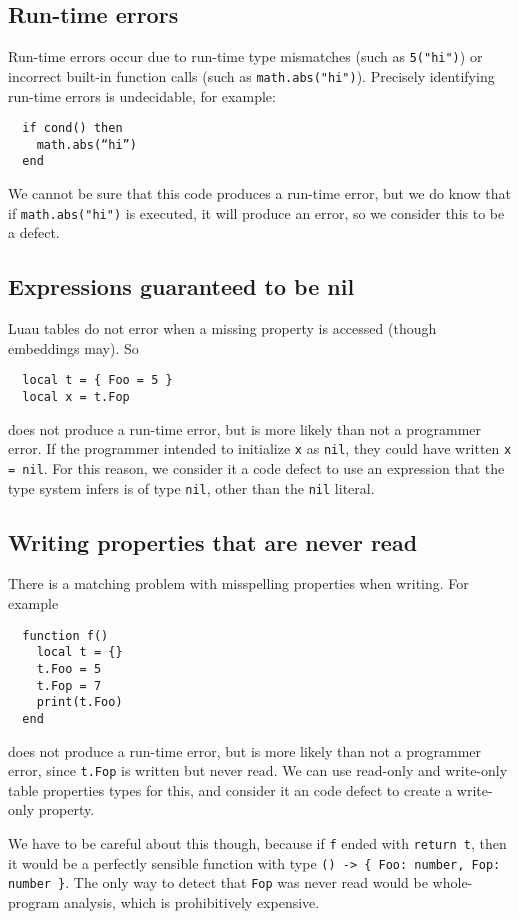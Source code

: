 \documentclass[sigplan]{acmart}
\begin{document}
\subsection{Run-time errors}

Run-time errors occur due to run-time type mismatches (such as \verb|5("hi")|)
or incorrect built-in function calls (such as \verb|math.abs("hi")|).
Precisely identifying run-time errors is undecidable, for example:
\begin{verbatim}
  if cond() then
    math.abs(“hi”)
  end
\end{verbatim}
We cannot be sure that this code produces a run-time
error, but we do know that if \verb|math.abs("hi")| is executed, it
will produce an error, so we consider this to be a defect.

\subsection{Expressions guaranteed to be nil}

Luau tables do not error when a missing property is accessed (though embeddings may). So
\begin{verbatim}
  local t = { Foo = 5 }
  local x = t.Fop
\end{verbatim}
does not produce a run-time error, but is more likely than not a
programmer error. If the programmer intended to
initialize \verb|x| as \verb|nil|, they could have written
\verb|x = nil|.  For this reason, we consider it a code defect to use
an expression that the type system infers is of type \verb|nil|, other
than the \verb|nil| literal.

\subsection{Writing properties that are never read}

There is a matching problem with misspelling properties when writing. For example
\begin{verbatim}
  function f()
    local t = {}
    t.Foo = 5
    t.Fop = 7
    print(t.Foo)
  end
\end{verbatim}
does not produce a run-time error, but is more likely than not a
programmer error, since \verb|t.Fop| is written but never read. We can use
read-only and write-only table properties types for this, and consider it an
code defect to create a write-only property.

We have to be careful about this though, because if \verb|f| ended
with \verb|return t|, then it would be a perfectly sensible function
with type \verb|() -> { Foo: number, Fop: number }|. The only way to detect
that \verb|Fop| was never read would be whole-program analysis, which is
prohibitively expensive.
\end{document}
